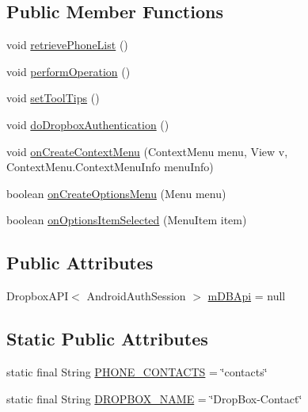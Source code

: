 \subsection*{Public Member Functions}
\begin{DoxyCompactItemize}
\item 
void \hyperlink{classcourse_1_1examples_1_1phoneapp_1_1_ops_activity_a4483070d81483a14c450c03a23521b33}{retrieve\+Phone\+List} ()
\item 
void \hyperlink{classcourse_1_1examples_1_1phoneapp_1_1_ops_activity_a427848e2c42eb538b888f8b7214b8cd4}{perform\+Operation} ()
\item 
void \hyperlink{classcourse_1_1examples_1_1phoneapp_1_1_ops_activity_a55825f56d10a878fc5516121f0eda3bf}{set\+Tool\+Tips} ()
\item 
void \hyperlink{classcourse_1_1examples_1_1phoneapp_1_1_ops_activity_ae6f21dd987eba779e66e4bb66bbee391}{do\+Dropbox\+Authentication} ()
\item 
void \hyperlink{classcourse_1_1examples_1_1phoneapp_1_1_ops_activity_a329fad70246e569c6746b7a38f35e6e6}{on\+Create\+Context\+Menu} (Context\+Menu menu, View v, Context\+Menu.\+Context\+Menu\+Info menu\+Info)
\item 
boolean \hyperlink{classcourse_1_1examples_1_1phoneapp_1_1_ops_activity_a1c9753b2bbe4cf6d37c17f3a97df304b}{on\+Create\+Options\+Menu} (Menu menu)
\item 
boolean \hyperlink{classcourse_1_1examples_1_1phoneapp_1_1_ops_activity_a6175dfaf6290e9c3a13da40e5ef61e60}{on\+Options\+Item\+Selected} (Menu\+Item item)
\end{DoxyCompactItemize}
\subsection*{Public Attributes}
\begin{DoxyCompactItemize}
\item 
Dropbox\+A\+P\+I$<$ Android\+Auth\+Session $>$ \hyperlink{classcourse_1_1examples_1_1phoneapp_1_1_ops_activity_afa9dcbfe8d531688656b8ee3042ccba6}{m\+D\+B\+Api} = null
\end{DoxyCompactItemize}
\subsection*{Static Public Attributes}
\begin{DoxyCompactItemize}
\item 
static final String \hyperlink{classcourse_1_1examples_1_1phoneapp_1_1_ops_activity_a6bbe27893d347a4f66c9bac0e2dcc80b}{P\+H\+O\+N\+E\+\_\+\+C\+O\+N\+T\+A\+C\+T\+S} = \char`\"{}contacts\char`\"{}
\item 
static final String \hyperlink{classcourse_1_1examples_1_1phoneapp_1_1_ops_activity_ac2c7991a146c46106d21d22d1896ec35}{D\+R\+O\+P\+B\+O\+X\+\_\+\+N\+A\+M\+E} = \char`\"{}Drop\+Box-\/Contact\char`\"{}
\end{DoxyCompactItemize}
